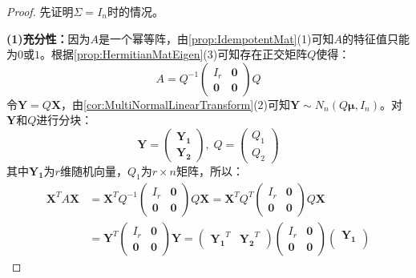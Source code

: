 \begin{proof}
	先证明$\Sigma=I_n$时的情况。\par
	\textbf{(1)充分性：}因为$A$是一个幂等阵，由\cref{prop:IdempotentMat}(1)可知$A$的特征值只能为$0$或$1$。根据\cref{prop:HermitianMatEigen}(3)可知存在正交矩阵$Q$使得：
	\begin{equation*}
		A=Q^{-1}
		\begin{pmatrix}
			I_r & \mathbf{0} \\
			\mathbf{0} & \mathbf{0}
		\end{pmatrix}Q
	\end{equation*}
	令$\mathbf{Y}=Q\mathbf{X}$，由\cref{cor:MultiNormalLinearTransform}(2)可知$\mathbf{Y}\sim N_n(Q\boldsymbol{\mu},I_n)$。对$\mathbf{Y}$和$Q$进行分块：
	\begin{equation*}
		\mathbf{Y}=
		\begin{pmatrix}
			\mathbf{Y_1} \\
			\mathbf{Y_2}
		\end{pmatrix},\;
		Q=
		\begin{pmatrix}
			Q_1 \\
			Q_2
		\end{pmatrix}
	\end{equation*}
	其中$\mathbf{Y_1}$为$r$维随机向量，$Q_1$为$r\times n$矩阵，所以：
	\begin{align*}
		\mathbf{X}^TA\mathbf{X}&=\mathbf{X}^TQ^{-1}
		\begin{pmatrix}
			I_r & \mathbf{0} \\
			\mathbf{0} & \mathbf{0}
		\end{pmatrix}Q\mathbf{X}=\mathbf{X}^TQ^T
		\begin{pmatrix}
			I_r & \mathbf{0} \\
			\mathbf{0} & \mathbf{0}
		\end{pmatrix}Q\mathbf{X} \\
		&=\mathbf{Y}^T
		\begin{pmatrix}
			I_r & \mathbf{0} \\
			\mathbf{0} & \mathbf{0}
		\end{pmatrix}\mathbf{Y}
		=
		\begin{pmatrix}
			\mathbf{Y_1}^T & \mathbf{Y_2}^T
		\end{pmatrix}
		\begin{pmatrix}
			I_r & \mathbf{0} \\
			\mathbf{0} & \mathbf{0}
		\end{pmatrix}
		\begin{pmatrix}
			\mathbf{Y_1} \\

\end{pmatrix}
\end{align*}
\end{proof}
